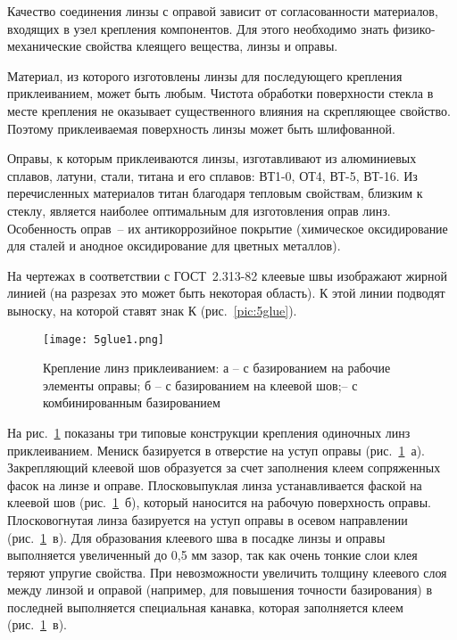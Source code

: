 Качество соединения линзы с оправой зависит от согласованности материалов, входящих в узел крепления компонентов. Для этого необходимо знать физико-механические свойства клеящего вещества, линзы и оправы.

Материал, из которого изготовлены линзы для последующего крепления приклеиванием, может быть любым. 
Чистота обработки поверхности стекла в месте крепления не оказывает существенного влияния на скрепляющее свойство. 
Поэтому приклеиваемая поверхность линзы может быть шлифованной.

Оправы, к которым приклеиваются линзы, изготавливают из алюминиевых сплавов, латуни, стали, титана и его сплавов: ВТ1-0, ОТ4, ВТ-5, ВТ-16. 
Из перечисленных материалов титан благодаря тепловым свойствам, близким к стеклу, является наиболее оптимальным для изготовления оправ линз. Особенность оправ~-- их антикоррозийное покрытие (химическое оксидирование для сталей и анодное оксидирование для цветных металлов).

На чертежах в соответствии с ГОСТ~2.313-82 клеевые швы изображают жирной линией (на разрезах это может быть некоторая область). 
К этой линии подводят выноску, на которой ставят знак К (рис.~\ref{pic:5glue}).

\begin{figure}[h!]
	\texttt{[image: 5glue1.png]}
	\label{pic:5glue1}
	\caption[Крепление линз приклеиванием]{Крепление линз приклеиванием: а -- с базированием на рабочие элементы оправы; б -- с базированием на клеевой шов; -- с комбинированным базированием}
\end{figure}

На рис.~\ref{pic:5glue1} показаны три типовые конструкции крепления одиночных линз приклеиванием. 
Мениск базируется в отверстие на уступ оправы (рис.~\ref{pic:5glue1}~а). 
Закрепляющий клеевой шов образуется за счет заполнения клеем сопряженных фасок на линзе и оправе. 
Плосковыпуклая линза устанавливается фаской на клеевой шов (рис.~\ref{pic:5glue1}~б), который наносится на рабочую поверхность оправы. 
Плосковогнутая линза базируется на уступ оправы в осевом направлении (рис.~\ref{pic:5glue1}~в). 
Для образования клеевого шва в посадке линзы и оправы выполняется увеличенный до 0,5 мм зазор, так как очень тонкие слои клея теряют упругие свойства. При невозможности увеличить толщину клеевого слоя между линзой и оправой (например, для повышения точности базирования) в последней выполняется специальная канавка, которая заполняется клеем (рис.~\ref{pic:5glue1}~в).

